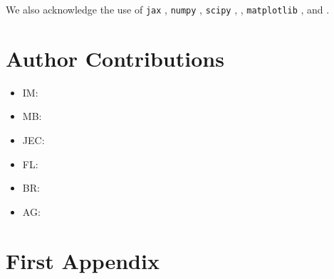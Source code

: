 \documentclass[twocolumn,twocolappendix]{openjournal}
\begin{document}
We also acknowledge the use of \texttt{jax} \citep{jax2018github,frostig2018compiling}, \texttt{numpy} \citep{numpy2020}, \texttt{scipy} \citep{scipy2020}, \astropy \citep{astropy:2013,astropy:2018,astropy:2022}, \texttt{matplotlib} \citep{matplotlib2007}, and \galsim \citep{galsim2015}.


\section*{Author Contributions} 

\begin{itemize}
    \item IM: 

    \item MB: 

    \item JEC: 

    \item FL: 

    \item BR: 

    \item AG: 
\end{itemize}

\appendix
\section*{First Appendix}\label{app:first}

{}



\end{document}
